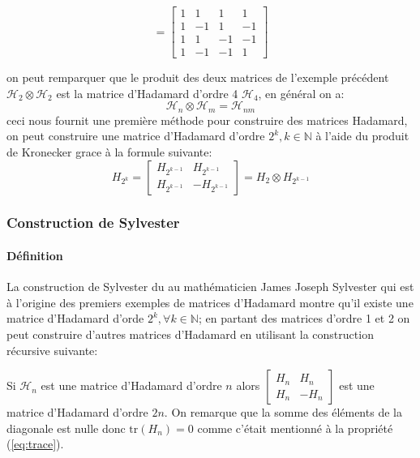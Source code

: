 \documentclass{article}
\begin{document}
\begin{equation*}
	= 
	\begin{bmatrix}
		1 & 1 & 1 & 1\\
		1 & -1 & 1 & -1\\
		1 & 1 & -1 & -1\\
		1 & -1 & -1 & 1
	\end{bmatrix}
\end{equation*}

on peut remparquer que le produit des deux matrices de l'exemple précédent 
$\mathcal{H}_2 \otimes \mathcal{H}_2$ est la matrice d'Hadamard d'ordre 4 
$\mathcal{H}_4$, en général on a:
\begin{equation}\label{eq:kronecker}
	\mathcal{H}_n \otimes \mathcal{H}_m = \mathcal{H}_{nm}
\end{equation}
ceci nous fournit une première méthode pour construire des matrices 
Hadamard, on peut construire une matrice d'Hadamard d'ordre $2^k, k \in 
\mathbb{N}$ à l'aide du produit de Kronecker grace à la formule suivante:
\begin{equation}
	H_{2^k} 
	=
	\begin{bmatrix}
		H_{2^{k-1}} & H_{2^{k-1}}\\
		H_{2^{k-1}} & -H_{2^{k-1}}
	\end{bmatrix}
	=
	H_2 \otimes H_{2^{k-1}}
\end{equation}

\subsubsection{Construction de Sylvester}

\paragraph{Définition}

La construction de Sylvester du au mathématicien James Joseph Sylvester 
qui est à l'origine des premiers exemples de matrices d'Hadamard montre 
qu'il existe une matrice d'Hadamard d'orde $2^k, \forall k \in \mathbb{N}$;
en partant des matrices d'ordre 1 et 2 on peut construire d'autres matrices
d'Hadamard en utilisant la construction récursive suivante:

Si $\mathcal{H}_n$ est une matrice d'Hadamard d'ordre $n$ alors 
$
	\begin{bmatrix}
		H_n & H_n\\
		H_n & -H_n
	\end{bmatrix}
$
est une matrice d'Hadamard d'ordre $2n$.
On remarque que la somme des éléments de la diagonale est nulle donc 
$\mathrm{tr}(H_n) = 0$ comme c'était mentionné à la propriété 
(\ref{eq:trace}).
\end{document}
